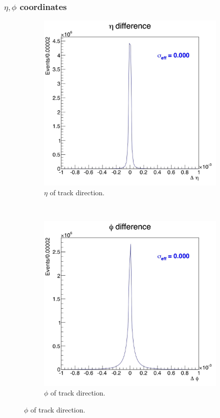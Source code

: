 \documentclass[10pt]{article}
\begin{document}
\subsubsection{$\eta,\phi$ coordinates}
\begin{figure}[h!]
        \centering
        \begin{subfigure}[b]{0.24\textwidth}
                \includegraphics[width=\textwidth]{fullRunPlots/eta}
                \caption{$\eta$ of track direction.}
               
        \end{subfigure}%
        ~ %
        \begin{subfigure}[b]{0.24\textwidth}
                \includegraphics[width=\textwidth]{fullRunPlots/phi}
                \caption{$\phi$ of track direction.}
            

\end{subfigure}
\end{figure}
\end{document}
